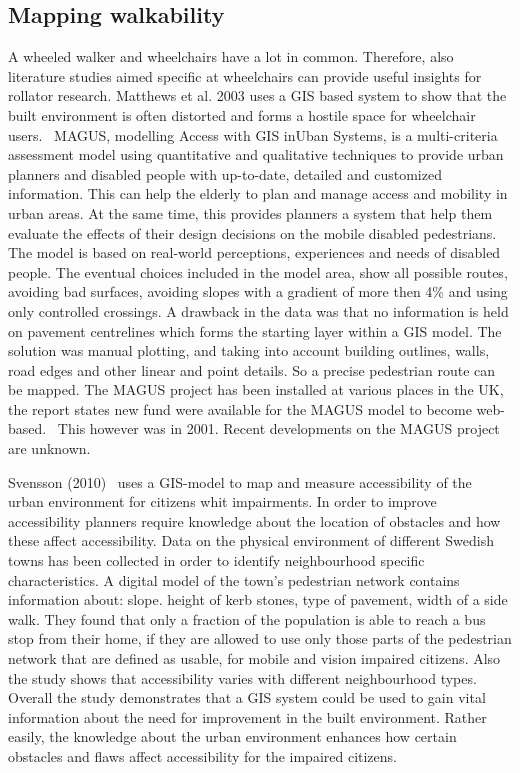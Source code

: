 \subsection{Mapping walkability}
A wheeled walker and wheelchairs have a lot in common. Therefore, also literature studies aimed specific at wheelchairs can provide useful insights for rollator research. Matthews et al. 2003 uses a GIS based system to show that the built environment is often distorted and forms a hostile space for wheelchair users.~\cite{Matthews2003} MAGUS, modelling Access with GIS inUban Systems, is a multi-criteria assessment model using quantitative and qualitative techniques to provide urban planners and disabled people with up-to-date, detailed and customized information. This can help the elderly to plan and manage access and mobility in urban areas. At the same time, this provides planners a system that help them evaluate the effects of their design decisions on the mobile disabled pedestrians.~\cite{Matthews2003} The model is based on real-world perceptions, experiences and needs of disabled people. The eventual choices included in the model area, show all possible routes, avoiding bad surfaces, avoiding slopes with a gradient of more then 4\% and using only controlled crossings. A drawback in the data was that no information is held on pavement centrelines which forms the starting layer within a GIS model. The solution was manual plotting, and taking into account building outlines, walls, road edges and other linear and point details. So a precise pedestrian route can be mapped. The MAGUS project has been installed at various places in the UK, the report states new fund were available for the MAGUS model to become web-based.~\cite{Matthews2003} This however was in 2001. Recent developments on the MAGUS project are unknown. 

Svensson (2010)~\cite{Svensson2010} uses a GIS-model to map and measure accessibility of the urban environment for citizens whit impairments. In order to improve accessibility planners require knowledge about the location of obstacles and how these affect accessibility. Data on the physical environment of different Swedish towns has been collected in order to identify neighbourhood specific characteristics. A digital model of the town's pedestrian network contains information about: slope. height of kerb stones, type of pavement, width of a side walk. They found that only a fraction of the population is able to reach a bus stop from their home, if they are allowed to use only those parts of the pedestrian network that are defined as usable, for mobile and vision impaired citizens. Also the study shows that accessibility varies with different neighbourhood types.~\cite{Svensson2010} Overall the study demonstrates that a GIS system could be used to gain vital information about the need for improvement in the built environment. Rather easily, the knowledge about the urban environment enhances how certain obstacles and flaws affect accessibility for the impaired citizens.~\cite{Svensson2010}

